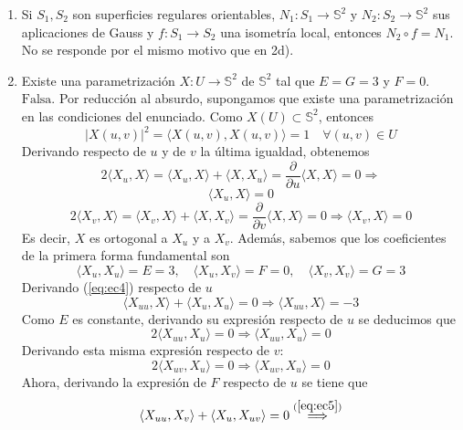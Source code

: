 \documentclass[12pt]{article}
\newcommand{\Ss}{\mathbb{S}}
\newcommand{\prodesc}[2]{\langle #1, #2 \rangle}
\begin{document}
\begin{ejercicio}
\begin{enumerate}
            \item[c)] Si $S_1,S_2$ son superficies regulares orientables, $N_1:S_1\to \mathbb{S}^2$ y $N_2:S_2\to \mathbb{S}^2$ sus aplicaciones 
            de Gauss y $f:S_1\to S_2$ una isometría local, entonces $N_2\circ f=N_1$. \\

            No se responde por el mismo motivo que en 2d).

            \item[d)] Existe una parametrización $X:U\to \mathbb{S}^2$ de $\mathbb{S}^2$ tal que $E=G=3$ y $F=0$. \\
            
            $\boxed{\text{Falsa}}$. Por reducción al absurdo, supongamos que existe una parametrización en las condiciones del enunciado.
            Como $X(U) \subset \Ss^2$, entonces $$|X(u,v)|^2 = \prodesc{X(u,v)}{X(u,v)} = 1 \quad \forall (u,v) \in U$$ Derivando 
            respecto de $u$ y de $v$ la última igualdad, obtenemos
            $$2 \prodesc{X_u}{X} = \prodesc{X_u}{X} + \prodesc{X}{X_u} = \dfrac{\partial}{\partial u} \prodesc{X}{X} = 0 \Longrightarrow
            $$
            \begin{equation}\label{eq:ec4}
                \prodesc{X_u}{X} = 0
            \end{equation}
            $$2 \prodesc{X_v}{X} = \prodesc{X_v}{X} + \prodesc{X}{X_v} = \dfrac{\partial}{\partial v} \prodesc{X}{X} = 0 \Longrightarrow 
            \prodesc{X_v}{X} = 0$$
            Es decir, $X$ es ortogonal a $X_u$ y a $X_v$. Además, sabemos que los coeficientes de la primera forma fundamental son
            $$\prodesc{X_u}{X_u} = E = 3, \quad \prodesc{X_u}{X_v} = F = 0, \quad \prodesc{X_v}{X_v} = G = 3$$
            Derivando (\ref{eq:ec4}) respecto de $u$
            $$\prodesc{X_{uu}}{X} + \prodesc{X_u}{X_u} = 0 \Longrightarrow \prodesc{X_{uu}}{X} = -3$$
            Como $E$ es constante, derivando su expresión respecto de $u$ se deducimos que
            $$2\prodesc{X_{uu}}{X_u} = 0 \Longrightarrow \prodesc{X_{uu}}{X_u} = 0$$
            Derivando esta misma expresión respecto de $v$:
            \begin{equation}\label{eq:ec5}
                2 \prodesc{X_{uv}}{X_u} = 0 \Longrightarrow \prodesc{X_{uv}}{X_u} = 0
            \end{equation}
            Ahora, derivando la expresión de $F$ respecto de $u$ se tiene que
            $$\prodesc{X_{uu}}{X_v} + \prodesc{X_{u}}{X_{uv}} = 0 \stackrel{(\ref{eq:ec5})}{\Longrightarrow}
$$
\end{enumerate}
\end{ejercicio}
\end{document}
